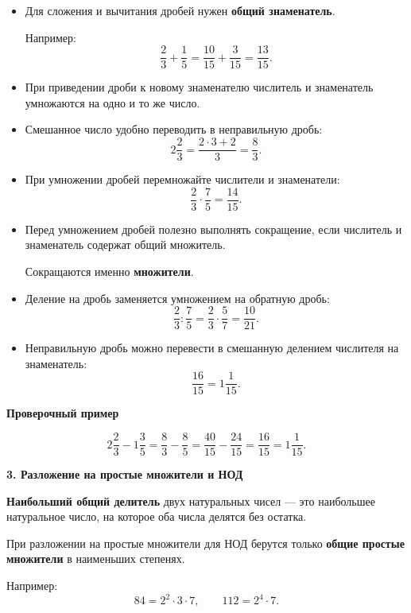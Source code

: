 \documentclass[a4paper,12pt]{article}
\newcommand{\subhead}[1]{%
    \vspace{0.25em}
    {\large\bfseries\textcolor{darkaccent}{#1}}\par
    \vspace{0.1em}
}
\begin{document}
\begin{itemize}

\item
Для сложения и вычитания дробей нужен
\textbf{общий знаменатель}.

Например:
\[
\frac23+\frac15
=
\frac{10}{15}+\frac{3}{15}
=
\frac{13}{15}.
\]

\item
При приведении дроби к новому знаменателю
числитель и знаменатель умножаются
на одно и то же число.

\item
Смешанное число удобно переводить
в неправильную дробь:
\[
2\frac23
=
\frac{2\cdot3+2}{3}
=
\frac83.
\]

\item
При умножении дробей перемножайте числители
и знаменатели:
\[
\frac23\cdot\frac75
=
\frac{14}{15}.
\]

\item
Перед умножением дробей полезно выполнять сокращение,
если числитель и знаменатель содержат общий множитель.

Сокращаются именно \textbf{множители}.

\item
Деление на дробь заменяется умножением
на обратную дробь:
\[
\frac23:\frac75
=
\frac23\cdot\frac57
=
\frac{10}{21}.
\]

\item
Неправильную дробь можно перевести
в смешанную делением числителя на знаменатель:
\[
\frac{16}{15}
=
1\frac{1}{15}.
\]

\end{itemize}

\textbf{Проверочный пример}

\[
2\frac23-1\frac35
=
\frac83-\frac85
=
\frac{40}{15}-\frac{24}{15}
=
\frac{16}{15}
=
1\frac1{15}.
\]


\subhead{3. Разложение на простые множители и НОД}

\textbf{Наибольший общий делитель} двух натуральных чисел ---
это наибольшее натуральное число,
на которое оба числа делятся без остатка.

При разложении на простые множители
для НОД берутся только
\textbf{общие простые множители}
в наименьших степенях.

Например:
\[
84=2^2\cdot3\cdot7,
\qquad
112=2^4\cdot7.
\]
\end{document}
